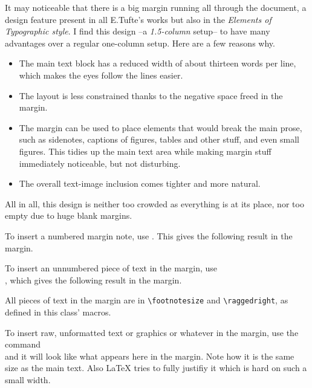 \documentclass[raggedright, twoside, 11pt]{tufte-style-article}
\begin{document}
It may noticeable that there is a big margin running all through the document, a design feature present in all E.Tufte's works but also in the \textit{Elements of Typographic style}. I find this design --a \textit{1.5-column} setup-- to have many advantages over a regular one-column setup. Here are a few reasons why.
\begin{itemize}
	\tightlist
	\item The main text block has a reduced width of about thirteen words per line, which makes the eyes follow the lines easier.
	
	\item The layout is less constrained thanks to the negative space freed in the margin.
	
	\item The margin can be used to place elements that would break the main prose, such as sidenotes, captions of figures, tables and other stuff, and even small figures. This tidies up the main text area while making margin stuff immediately noticeable, but not disturbing.
	
	\item The overall text-image inclusion comes tighter and more natural.
\end{itemize}
All in all, this design is neither too crowded as everything is at its place, nor too empty due to huge blank margins.

To insert a numbered margin note, use . This gives the following result in the margin.

To insert an unnumbered piece of text in the margin, use\\\noindent{}, which gives the following result in the margin.

All pieces of text in the margin are in \texttt{\textbackslash footnotesize} and \texttt{\textbackslash raggedright}, as defined in this class' macros.

To insert raw, unformatted text or graphics or whatever in the margin, use the command\\  and it will look like what appears here in the margin. Note how it is the same size as the main text. Also \LaTeX{} tries to fully justifiy it which is hard on such a small width.
\end{document}
